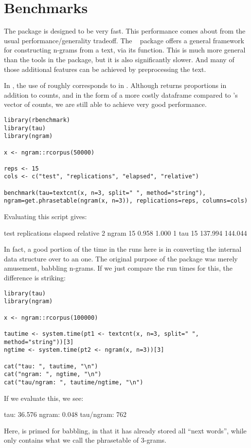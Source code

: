 \section{Benchmarks}\label{sec:benchmarks}

The  package is designed to be very fast.  This performance comes
about from the usual performance/generality tradeoff.  
The ~\citep{tau} package offers a general framework for constructing
n-grams from a text, via its  function.  This is much more
general than the tools in the  package, but it is also
significantly slower.  And many of those additional features can be achieved
by preprocessing the text.

In , the use of  roughly corresponds
to  in .  Although
 returns proportions in addition to counts, and in the
form of a more costly dataframe compared to 's vector of counts, we
are still able to achieve very good performance.
\begin{lstlisting}[language=rr]
library(rbenchmark)
library(tau)
library(ngram)

x <- ngram::rcorpus(50000)

reps <- 15
cols <- c("test", "replications", "elapsed", "relative")

benchmark(tau=textcnt(x, n=3, split=" ", method="string"), ngram=get.phrasetable(ngram(x, n=3)), replications=reps, columns=cols)
\end{lstlisting}
Evaluating this script gives:
\begin{Code}
   test replications elapsed relative
2 ngram           15   0.958    1.000
1   tau           15 137.994  144.044
\end{Code}

In fact, a good portion of the time in the  runs here is in converting the
internal  data structure over to an  one.  The original
purpose of the  package was merely amusement, babbling n-grams.
If we just compare the run times for this, the difference is striking:
\begin{lstlisting}[language=rr]
library(tau)
library(ngram)

x <- ngram::rcorpus(100000)

tautime <- system.time(pt1 <- textcnt(x, n=3, split=" ", method="string"))[3]
ngtime <- system.time(pt2 <- ngram(x, n=3))[3]

cat("tau: ", tautime, "\n")
cat("ngram: ", ngtime, "\n")
cat("tau/ngram: ", tautime/ngtime, "\n")
\end{lstlisting}
If we evaluate this, we see:
\begin{Code}
tau:  36.576 
ngram:  0.048 
tau/ngram:  762 
\end{Code}
Here,  is primed for babbling, in that it has already stored all
``next words'', while  only contains what we call the phrasetable of
3-grams.
